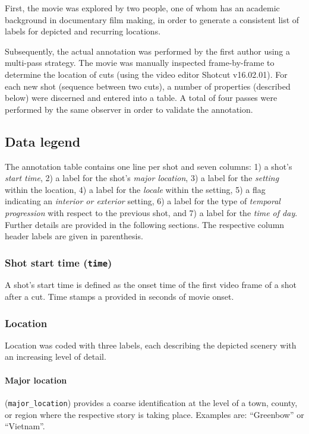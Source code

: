 \documentclass[10pt,a4paper]{article}
\begin{document}
\begin{multicols}{2}
First, the movie was explored by two people, one of whom has an academic
background in documentary film making, in order to generate a consistent list of
labels for depicted and recurring locations.

Subsequently, the actual annotation was performed by the first author using a
multi-pass strategy. The movie was manually inspected frame-by-frame to
determine the location of cuts (using the video editor Shotcut v16.02.01).
For each new shot (sequence between two cuts), a number of properties (described
below) were discerned and entered into a table. A total of four passes were
performed by the same observer in order to validate the annotation.

\subsection*{Data legend}

The annotation table contains one line per shot and seven columns: 1) a shot's
\textit{start time}, 2) a label for the shot's \textit{major location}, 3) a
label for the \textit{setting} within the location, 4) a label for the
\textit{locale} within the setting, 5) a flag indicating an \textit{interior or
exterior} setting, 6) a label for the type of \textit{temporal progression}
with respect to the previous shot, and 7) a label for the \textit{time of day}.
Further details are provided in the following sections. The respective column
header labels are given in parenthesis.


\subsubsection*{Shot start time (\texttt{time})}

A shot's start time is defined as the onset time of the first video frame of a
shot after a cut. Time stamps a provided in seconds of movie onset.

\subsubsection*{Location}

Location was coded with three labels, each describing the depicted scenery
with an increasing level of detail.

\paragraph{Major location} (\texttt{major\_location}) provides a coarse
identification at the level of a town, county, or region where the respective
story is taking place. Examples are: ``Greenbow'' or ``Vietnam''.


\end{multicols}
\end{document}
